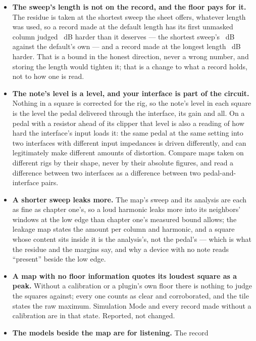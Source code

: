 \documentclass[11pt,a4paper]{article}
\begin{document}
\begin{itemize}
  \item \textbf{The sweep's length is not on the record, and the floor
  pays for it.} The residue is taken at the shortest sweep the sheet
  offers, whatever length was used, so a record made at the default
  length has its first unmasked column judged \gmResiduePenaltyDefaultDB{}~dB
  harder than it deserves --- the shortest sweep's
  \journeyResidueColumnOneTwo{}~dB against the default's own
  \journeyResidueColumnOneFive{} --- and a record made at the longest
  length \gmResiduePenaltyLongestDB{}~dB harder. That is a bound in the
  honest direction, never a wrong number, and storing the length would
  tighten it; that is a change to what a record holds, not to how one is
  read.
  \item \textbf{The note's level is a level, and your interface is part of
  the circuit.} Nothing in a square is corrected for the rig, so the
  note's level in each square is the level the pedal delivered through
  the interface, its gain and all. On a pedal with a resistor ahead of
  its clipper that level is also a reading of how hard the interface's
  input loads it: the same pedal at the same setting into two interfaces
  with different input impedances is driven differently, and can
  legitimately make different amounts of distortion. Compare maps taken
  on different rigs by their shape, never by their absolute figures, and
  read a difference between two interfaces as a difference between two
  pedal-and-interface pairs.
  \item \textbf{A shorter sweep leaks more.} The map's sweep and its
  analysis are each \gmTransformShareOfFingerprint{} as fine as chapter
  one's, so a loud harmonic leaks more into its neighbors' windows at
  the low edge than chapter one's measured bound allows; the leakage map
  states the amount per column and harmonic, and a square whose content
  sits inside it is the analysis's, not the pedal's --- which is what the
  residue and the margins say, and why a device with no note reads
  ``present'' beside the low edge.
  \item \textbf{A map with no floor information quotes its loudest square
  as a peak.} Without a calibration or a plugin's own floor there is
  nothing to judge the squares against; every one counts as clear and
  corroborated, and the tile states the raw maximum. Simulation Mode and
  every record made without a calibration are in that state. Reported,
  not changed.
  \item \textbf{The models beside the map are for listening.} The record

\end{itemize}
\end{document}
